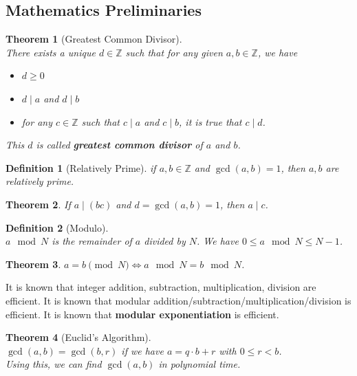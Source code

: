 \documentclass[12pt]{article}
\newtheorem{definition}{Definition}[section]
\newtheorem{theorem}{Theorem}[section]
\theoremstyle{definition}
\begin{document}
\subsection{Mathematics Preliminaries}
\begin{theorem}[Greatest Common Divisor]
\hfill\\\normalfont There exists a unique $d\in\mathbb{Z}$ such that for any given $a,b\in\mathbb{Z}$, we have
\begin{itemize}
\item $d\geq 0$
\item $d\mid a$ and $d\mid b$
\item for any $c\in \mathbb{Z}$ such that $c\mid a$ and $c\mid b$, it is true that $c\mid d$.
\end{itemize}
This $d$ is called \textbf{greatest common divisor} of $a$ and $b$.
\end{theorem}
\begin{definition}[Relatively Prime]
if $a,b\in\mathbb{Z}$ and $\gcd(a,b)=1$, then $a,b$ are relatively prime.
\end{definition}
\begin{theorem}\normalfont If $a\mid (bc)$ and $d=\gcd(a,b)=1$, then $a\mid c$.\end{theorem}
\begin{definition}[Modulo]
\hfill\\\normalfont $a\mod N$ is the remainder of $a$ divided by $N$. We have $0\leq a\mod N\leq N-1$.
\end{definition}
\begin{theorem} $a=b\pmod N \Leftrightarrow a\mod N = b\mod N$.\end{theorem}
It is known that integer addition, subtraction, multiplication, division are efficient. It is known that modular addition/subtraction/multiplication/division is efficient. It is known that \textbf{modular exponentiation} is efficient.
\begin{theorem}[Euclid's Algorithm]
\hfill\\\normalfont $\gcd(a,b)=\gcd(b,r)$ if we have $a=q\cdot b+r$ with $0\leq r<b$.\\
Using this, we can find $\gcd(a,b)$ in polynomial time.
\end{theorem}
\end{document}
